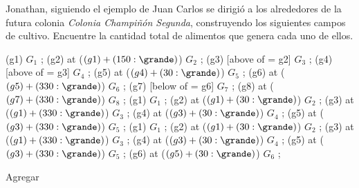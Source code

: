 \begin{probgrupal}{}{}{}

Jonathan, siguiendo el ejemplo de Juan Carlos se dirigió a los alrededores de la futura colonia \emph{Colonia Champiñón Segunda}, construyendo los siguientes campos de cultivo. %
Encuentre la cantidad total de alimentos que genera cada uno de ellos.

\begin{center}
\cultivos
\granja (g1) {$G_1$} ;
\granja (g2) at ($(g1) + (150:\grande)$) {$G_2$} ;
\granja (g3) [above of = g2] {$G_3$} ;
\granja (g4) [above of = g3] {$G_4$} ;
\granja (g5) at ($(g4) + (30:\grande)$) {$G_5$} ;
\granja (g6) at ($(g5) + (330:\grande)$) {$G_6$} ;
\granja (g7) [below of = g6] {$G_7$} ;
\granja (g8) at ($(g7) + (330:\grande)$) {$G_8$} ;
\finfin
\hspace{15mm}
\cultivos
\granja (g1) {$G_1$} ;
\granja (g2) at ($(g1) + (30:\grande)$) {$G_2$} ;
\granja (g3) at ($(g1) + (330:\grande)$) {$G_3$} ;
\granja (g4) at ($(g3) + (30:\grande)$) {$G_4$} ;
\granja (g5) at ($(g3) + (330:\grande)$) {$G_5$} ;
\finfin
\hspace{15mm}
\cultivos
\granja (g1) {$G_1$} ;
\granja (g2) at ($(g1) + (30:\grande)$) {$G_2$} ;
\granja (g3) at ($(g1) + (330:\grande)$) {$G_3$} ;
\granja (g4) at ($(g3) + (30:\grande)$) {$G_4$} ;
\granja (g5) at ($(g3) + (330:\grande)$) {$G_5$} ;
\granja (g6) at ($(g5) + (30:\grande)$) {$G_6$} ;
\finfin
\end{center}

\end{probgrupal}


\begin{solgrupal}
Agregar
\end{solgrupal}


